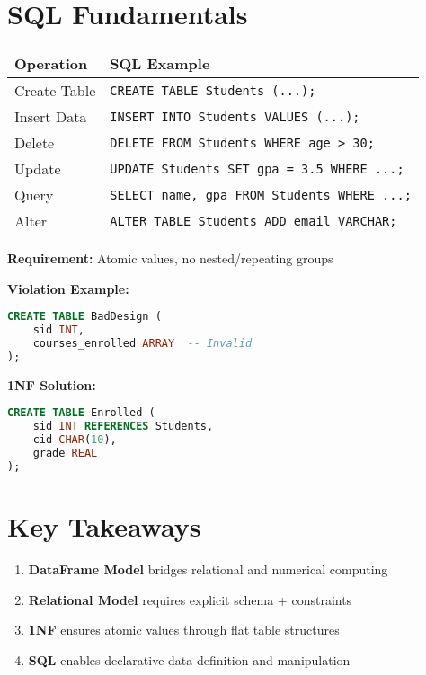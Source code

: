 \documentclass[12pt]{article}
\begin{document}
\section{SQL Fundamentals}
\begin{tcolorbox}[colback=green!5!white,colframe=green!75!black,title=Essential Operations]
\renewcommand{\arraystretch}{1.2}
\begin{tabular}{ll}
  \textbf{Operation} & \textbf{SQL Example} \\ \hline
  Create Table & \texttt{CREATE TABLE Students (...);} \\
  Insert Data & \texttt{INSERT INTO Students VALUES (...);} \\
  Delete & \texttt{DELETE FROM Students WHERE age > 30;} \\
  Update & \texttt{UPDATE Students SET gpa = 3.5 WHERE ...;} \\
  Query & \texttt{SELECT name, gpa FROM Students WHERE ...;} \\
  Alter & \texttt{ALTER TABLE Students ADD email VARCHAR;} \\
\end{tabular}
\end{tcolorbox}

\begin{tcolorbox}[colback=yellow!5!white,colframe=yellow!75!black,title=First Normal Form (1NF)]
\textbf{Requirement:} Atomic values, no nested/repeating groups

\textbf{Violation Example:}
\begin{lstlisting}[language=SQL]
CREATE TABLE BadDesign (
    sid INT,
    courses_enrolled ARRAY  -- Invalid
);
\end{lstlisting}

\textbf{1NF Solution:}
\begin{lstlisting}[language=SQL]
CREATE TABLE Enrolled (
    sid INT REFERENCES Students,
    cid CHAR(10),
    grade REAL
);
\end{lstlisting}
\end{tcolorbox}

\section{Key Takeaways}
\begin{tcolorbox}[colback=red!5!white,colframe=red!75!black,title=Essential Concepts]
\begin{enumerate}
    \item \textbf{DataFrame Model} bridges relational and numerical computing
    \item \textbf{Relational Model} requires explicit schema + constraints
    \item \textbf{1NF} ensures atomic values through flat table structures
    \item \textbf{SQL} enables declarative data definition and manipulation
\end{enumerate}
\end{tcolorbox}
\end{document}
